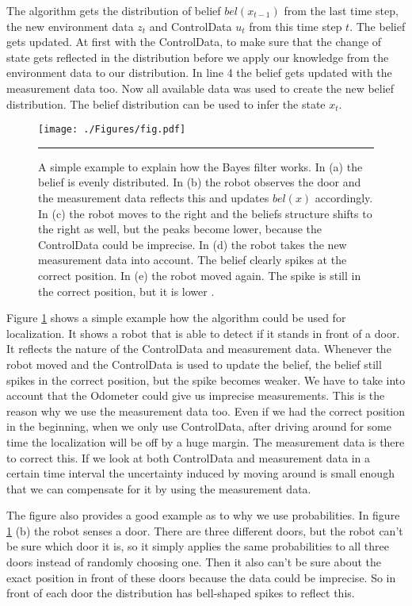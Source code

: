 The algorithm gets the distribution of belief $bel(x_{t-1})$ from the last time step, the new environment data $z_t$ and \gls{ControlData} $u_t$ from this time step $t$. The belief gets updated. At first with the \gls{ControlData}, to make sure that the change of state gets reflected in the distribution before we apply our knowledge from the environment data to our distribution. In line 4 the belief gets updated with the measurement data too. Now all available data was used to create the new belief distribution. The belief distribution can be used to infer the state $x_t$. 

\begin{figure}[htbp]
	\centering
		\texttt{[image: ./Figures/fig.pdf]}
		\rule{35em}{0.5pt}
	\caption[Localization Example]{A simple example to explain how the Bayes filter works. In (a) the belief is evenly distributed. In (b) the robot observes the door and the measurement data reflects this and updates $bel(x)$ accordingly. In (c) the robot moves to the right and the beliefs structure shifts to the right as well, but the peaks become lower, because the \gls{ControlData} could be imprecise. In (d) the robot takes the new measurement data into account. The belief clearly spikes at the correct position. In (e) the robot moved again. The spike is still in the correct position, but it is lower \citep[p.\ 6]{Thrun:2005:PR:1121596}.}
	\label{fig:loc_example}
\end{figure}

Figure \ref{fig:loc_example} shows a simple example how the algorithm could be used for localization. It shows a robot that is able to detect if it stands in front of a door. It reflects the nature of the \gls{ControlData} and measurement data. Whenever the robot moved and the \gls{ControlData} is used to update the belief, the belief still spikes in the correct position, but the spike becomes weaker. We have to take into account that the \gls{Odometer} could give us imprecise measurements. This is the reason why we use the measurement data too. Even if we had the correct position in the beginning, when we only use \gls{ControlData}, after driving around for some time the localization will be off by a huge margin. The measurement data is there to correct this. If we look at both \gls{ControlData} and measurement data in a certain time interval the uncertainty induced by moving around is small enough that we can compensate for it by using the measurement data. 

The figure also provides a good example as to why we use probabilities. In figure \ref{fig:loc_example} (b) the robot senses a door. There are three different doors, but the robot can't be sure which door it is, so it simply applies the same probabilities to all three doors instead of randomly choosing one. Then it also can't be sure about the exact position in front of these doors because the data could be imprecise. So in front of each door the distribution has bell-shaped spikes to reflect this. 

